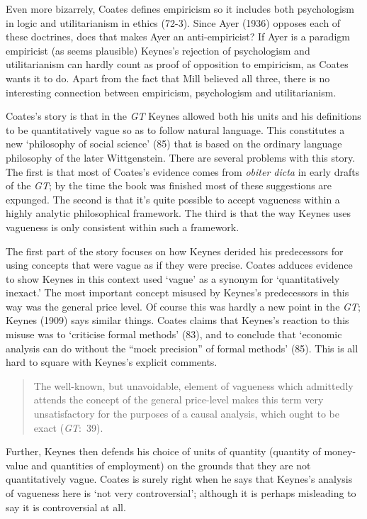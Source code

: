 \documentclass[noflushend]{philosophersimprint}
\begin{document}
Even more bizarrely, Coates defines empiricism so it includes both
psychologism in logic and utilitarianism in ethics (72-3). Since Ayer
(1936) opposes each of these doctrines, does that makes Ayer an
anti-empiricist? If Ayer is a paradigm empiricist (as seems plausible)
Keynes's rejection of psychologism and utilitarianism can hardly count
as proof of opposition to empiricism, as Coates wants it to do. Apart
from the fact that Mill believed all three, there is no interesting
connection between empiricism, psychologism and utilitarianism.

Coates's story is that in the \emph{GT} Keynes allowed both his units
and his definitions to be quantitatively vague so as to follow natural
language. This constitutes a new `philosophy of social science' (85)
that is based on the ordinary language philosophy of the later
Wittgenstein. There are several problems with this story. The first is
that most of Coates's evidence comes from \emph{obiter dicta} in early
drafts of the \emph{GT}; by the time the book was finished most of these
suggestions are expunged. The second is that it's quite possible to
accept vagueness within a highly analytic philosophical framework. The
third is that the way Keynes uses vagueness is only consistent within
such a framework.

The first part of the story focuses on how Keynes derided his
predecessors for using concepts that were vague as if they were precise.
Coates adduces evidence to show Keynes in this context used `vague' as a
synonym for `quantitatively inexact.' The most important concept misused
by Keynes's predecessors in this way was the general price level. Of
course this was hardly a new point in the \emph{GT}; Keynes (1909) says
similar things. Coates claims that Keynes's reaction to this misuse was
to `criticise formal methods' (83), and to conclude that `economic
analysis can do without the ``mock precision'' of formal methods' (85).
This is all hard to square with Keynes's explicit comments.

\begin{quote}
The well-known, but unavoidable, element of vagueness which admittedly
attends the concept of the general price-level makes this term very
unsatisfactory for the purposes of a causal analysis, which ought to be
exact (\emph{GT}:~39).
\end{quote}

Further, Keynes then defends his choice of units of quantity (quantity
of money-value and quantities of employment) on the grounds that they
are not quantitatively vague. Coates is surely right when he says that
Keynes's analysis of vagueness here is `not very controversial';
although it is perhaps misleading to say it is controversial at all.
\end{document}
